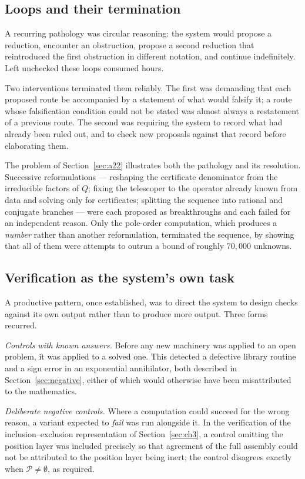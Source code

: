 \documentclass[11pt]{article}
\theoremstyle{definition}
\begin{document}
\subsection{Loops and their termination}

A recurring pathology was circular reasoning: the system would propose a
reduction, encounter an obstruction, propose a second reduction that reintroduced
the first obstruction in different notation, and continue indefinitely. Left
unchecked these loops consumed hours.

Two interventions terminated them reliably. The first was demanding that each
proposed route be accompanied by a statement of what would falsify it; a route
whose falsification condition could not be stated was almost always a
restatement of a previous route. The second was requiring the system to record
what had already been ruled out, and to check new proposals against that record
before elaborating them.

The problem of Section~\ref{sec:a22} illustrates both the pathology and its
resolution. Successive reformulations --- reshaping the certificate denominator
from the irreducible factors of $Q$; fixing the telescoper to the operator
already known from data and solving only for certificates; splitting the
sequence into rational and conjugate branches --- were each proposed as
breakthroughs and each failed for an independent reason. Only the pole-order
computation, which produces a \emph{number} rather than another reformulation,
terminated the sequence, by showing that all of them were attempts to outrun a
bound of roughly $70{,}000$ unknowns.

\subsection{Verification as the system's own task}

A productive pattern, once established, was to direct the system to design
checks against its own output rather than to produce more output. Three forms
recurred.

\emph{Controls with known answers.} Before any new machinery was applied to an
open problem, it was applied to a solved one. This detected a defective library
routine and a sign error in an exponential annihilator, both described in
Section~\ref{sec:negative}, either of which would otherwise have been
misattributed to the mathematics.

\emph{Deliberate negative controls.} Where a computation could succeed for the
wrong reason, a variant expected to \emph{fail} was run alongside it. In the
verification of the inclusion--exclusion representation of
Section~\ref{sec:ch3}, a control omitting the position layer was included
precisely so that agreement of the full assembly could not be attributed to the
position layer being inert; the control disagrees exactly when
$\mathcal P\ne\emptyset$, as required.
\end{document}

